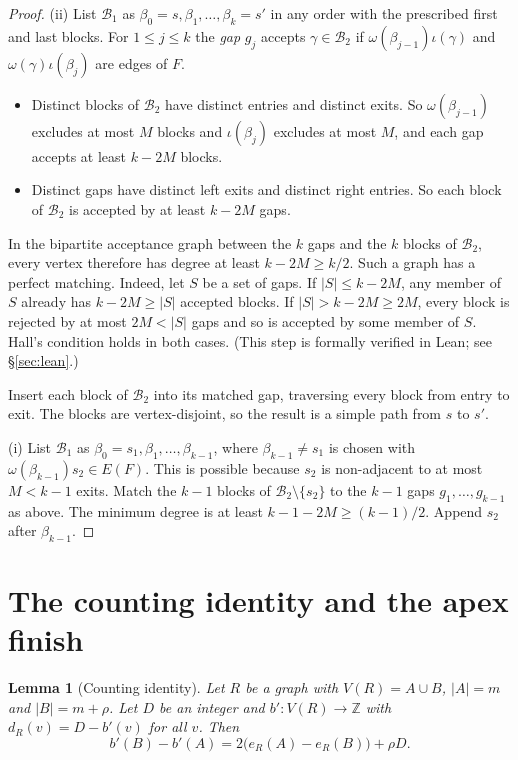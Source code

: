\documentclass[11pt]{article}
\newtheorem{lemma}[theorem]{Lemma}
\theoremstyle{definition}
\begin{document}
\begin{proof}
(ii) List $\mathcal B_1$ as $\beta_0=s,\beta_1,\dots,\beta_k=s'$ in any order with the prescribed first and last blocks. For $1\le j\le k$ the \emph{gap} $g_j$ accepts $\gamma\in\mathcal B_2$ if $\omega(\beta_{j-1})\iota(\gamma)$ and $\omega(\gamma)\iota(\beta_j)$ are edges of $F$.
\begin{itemize}[nosep]
\item Distinct blocks of $\mathcal B_2$ have distinct entries and distinct exits. So $\omega(\beta_{j-1})$ excludes at most $M$ blocks and $\iota(\beta_j)$ excludes at most $M$, and each gap accepts at least $k-2M$ blocks.
\item Distinct gaps have distinct left exits and distinct right entries. So each block of $\mathcal B_2$ is accepted by at least $k-2M$ gaps.
\end{itemize}
In the bipartite acceptance graph between the $k$ gaps and the $k$ blocks of $\mathcal B_2$, every vertex therefore has degree at least $k-2M\ge k/2$. Such a graph has a perfect matching. Indeed, let $S$ be a set of gaps. If $|S|\le k-2M$, any member of $S$ already has $k-2M\ge|S|$ accepted blocks. If $|S|>k-2M\ge2M$, every block is rejected by at most $2M<|S|$ gaps and so is accepted by some member of $S$. Hall's condition holds in both cases. (This step is formally verified in Lean; see \S\ref{sec:lean}.)

Insert each block of $\mathcal B_2$ into its matched gap, traversing every block from entry to exit. The blocks are vertex-disjoint, so the result is a simple path from $s$ to $s'$.

(i) List $\mathcal B_1$ as $\beta_0=s_1,\beta_1,\dots,\beta_{k-1}$, where $\beta_{k-1}\neq s_1$ is chosen with $\omega(\beta_{k-1})s_2\in E(F)$. This is possible because $s_2$ is non-adjacent to at most $M<k-1$ exits. Match the $k-1$ blocks of $\mathcal B_2\setminus\{s_2\}$ to the $k-1$ gaps $g_1,\dots,g_{k-1}$ as above. The minimum degree is at least $k-1-2M\ge(k-1)/2$. Append $s_2$ after $\beta_{k-1}$.
\end{proof}

\section{The counting identity and the apex finish}\label{sec:identity}

\begin{lemma}[Counting identity]\label{lem:identity}
Let $R$ be a graph with $V(R)=A\cup B$, $|A|=m$ and $|B|=m+\rho$. Let $D$ be an integer and $b':V(R)\to\mathbb Z$ with $d_R(v)=D-b'(v)$ for all $v$. Then
\[
b'(B)-b'(A)=2\bigl(e_R(A)-e_R(B)\bigr)+\rho D .
\]
\end{lemma}
\end{document}
